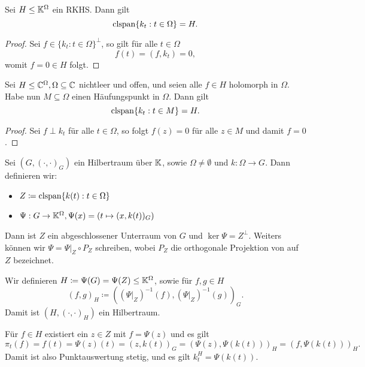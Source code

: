 \begin{lemma}
    Sei $H \leq \mathbb{K}^\Omega$ ein RKHS. Dann gilt
    $$ \mathrm{clspan} \{ k_t : t \in \Omega \} = H. $$
\end{lemma}

\begin{proof}
    Sei $f \in \{ k_t : t \in \Omega \}^\perp$, so gilt für alle $t \in \Omega$
    $$ f(t) = (f, k_t) = 0, $$
    womit $f = 0 \in H$ folgt.
\end{proof}

\begin{corollary}
    Sei $H \leq \mathbb{C}^\Omega, \Omega \subseteq \mathbb{C}$ nichtleer und offen, und seien alle $f \in H$ holomorph in $\Omega$. Habe nun $M \subseteq \Omega$ einen Häufungspunkt in $\Omega$. Dann gilt
    $$ \mathrm{clspan} \{ k_t : t \in M \} = H. $$
\end{corollary}

\begin{proof}
    Sei $f \perp k_t$ für alle $t \in \Omega$, so folgt $f(z) = 0$ für alle $z \in M$ und damit $f = 0$.
\end{proof}

\begin{remark}
    Sei $(G, (\cdot, \cdot)_G)$ ein Hilbertraum über $\mathbb{K}$, sowie $\Omega \neq \emptyset$ und $k : \Omega \to G$. Dann definieren wir:
    \begin{itemize}
        \item $Z \coloneqq \mathrm{clspan} \{ k(t) : t \in \Omega \}$
        \item $\Psi : G \to \mathbb{K}^\Omega, \Psi(x) = (t \mapsto (x, k(t))_G)$
    \end{itemize}
    Dann ist $Z$ ein abgeschlossener Unterraum von $G$ und $\ker \Psi = Z^\perp$. Weiters können wir $\Psi = \Psi|_Z \circ P_Z$ schreiben, wobei $P_Z$ die orthogonale Projektion von auf $Z$ bezeichnet.

    Wir definieren $H \coloneqq \Psi(G) = \Psi(Z) \leq \mathbb{K}^\Omega$, sowie für $f, g \in H$
    $$ (f, g)_H \coloneqq ((\Psi|_Z)^{-1}(f), (\Psi|_Z)^{-1}(g))_G. $$
    Damit ist $(H, (\cdot, \cdot)_H)$ ein Hilbertraum.
    
    Für $f \in H$ existiert ein $z \in Z$ mit $f = \Psi(z)$ und es gilt
    $$ \pi_t(f) = f(t) = \Psi(z)(t) = (z, k(t))_G = (\Psi(z), \Psi(k(t)))_H = (f, \Psi(k(t)))_H. $$
    Damit ist also Punktauswertung stetig, und es gilt $k_t^H = \Psi(k(t))$.
\end{remark}

